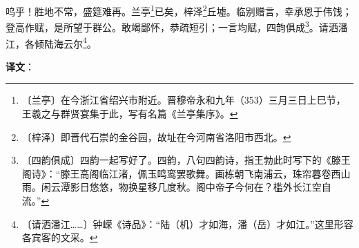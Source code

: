 \documentclass[12pt,UTF-8,openany,a4]{ctexbook}
\begin{document}
\begin{large}
    呜乎！胜地不常，盛筵难再。兰亭\footnote{〔兰亭〕\yiwen 在今浙江省绍兴市附近。晋穆帝永和九年（353）三月三日上巳节，王羲之与群贤宴集于此，写有名篇《兰亭集序》。}已矣，梓泽\footnote{〔梓泽〕\yiwen 即晋代石崇的金谷园，故址在今河南省洛阳市西北。}丘墟。临别赠言，幸承恩于伟饯；登高作赋，是所望于群公。敢竭鄙怀，恭疏短引；一言均赋，四韵俱成\footnote{〔四韵俱成〕\yiwen 四韵一起写好了。四韵，八句四韵诗，指王勃此时写下的《滕王阁诗》：“滕王高阁临江渚，佩玉鸣鸾罢歌舞。画栋朝飞南浦云，珠帘暮卷西山雨。闲云潭影日悠悠，物换星移几度秋。阁中帝子今何在？槛外长江空自流。”}。请洒潘江，各倾陆海云尔\footnote{〔请洒潘江……〕\yiwen 钟嵘《诗品》：“陆（机）才如海，潘（岳）才如江。”这里形容各宾客的文采。}。

\end{large}


\newpage

\begin{Large}
   \noindent \textbf{译文}：
\end{Large}

\vspace{1em}
\end{document}
